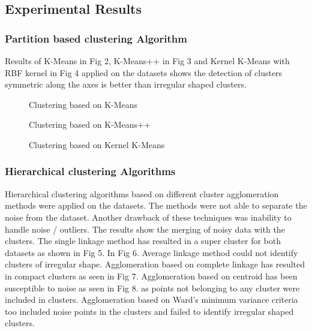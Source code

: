 \subsection{Experimental Results}


\subsubsection{Partition based clustering Algorithm}

Results of K-Means in Fig 2, K-Means++ in Fig 3 and Kernel K-Means with RBF kernel in Fig 4 applied on the datasets shows the detection of clusters symmetric along the axes is better than irregular shaped clusters.

\begin{figure}[H]
\centering
\setlength{\lineskip}{\medskipamount}
\hfill
{}
\caption{Clustering based on K-Means} \label{fig:1}
\end{figure}


\begin{figure}[H]
\centering
\setlength{\lineskip}{\medskipamount}
\hfill
{}
\caption{Clustering based on K-Means++} \label{fig:1}
\end{figure}


\begin{figure}[H]
\centering
\setlength{\lineskip}{\medskipamount}
\hfill
{}
\caption{Clustering based on Kernel K-Means} \label{fig:1}
\end{figure}



\subsubsection{Hierarchical clustering Algorithms}

Hierarchical clustering algorithms based on different cluster agglomeration methods were applied on the datasets. The methods were not able to separate the noise from the dataset. Another drawback of these techniques was inability to handle noise / outliers. The results show the merging of noisy data with the clusters. The single linkage method has resulted in a super cluster for both datasets as shown in Fig 5. In Fig 6. Average linkage method could not identify clusters of irregular shape. Agglomeration based on complete linkage has resulted in compact clusters as seen in Fig 7. Agglomeration based on centroid has been susceptible to noise as seen in Fig 8. as points not belonging to any cluster were included in clusters. Agglomeration based on Ward's minimum variance criteria too included noise points in the clusters and failed to identify irregular shaped clusters.      


